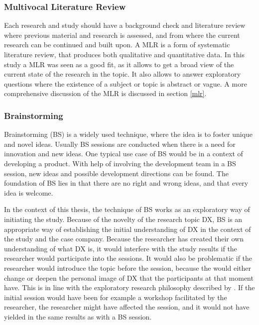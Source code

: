 \documentclass[english, 12pt, a4paper, sci, utf8, a-1b, online]{aaltothesis}
\begin{document}
\subsubsection{Multivocal Literature Review}



Each research and study should have a background check and literature review where previous material and research is assessed, and from where the current research can be continued and built upon. A MLR is a form of systematic literature review, that produces both qualitative and quantitative data. In this study a MLR was seen as a good fit, as it allows to get a broad view of the current state of the research in the topic. It also allows to answer exploratory questions where the existence of a subject or topic is abstract or vague. A more comprehensive discussion of the MLR is discussed in section \ref{mlr}.


\subsubsection{Brainstorming}

Brainstorming (BS) is a widely used technique, where the idea is to foster unique and novel ideas. Usually BS sessions are conducted when there is a need for innovation and new ideas. One typical use case of BS would be in a context of developing a product. With help of involving the development team in a BS session, new ideas and possible development directions can be found. The foundation of BS lies in that there are no right and wrong ideas, and that every idea is welcome.

In the context of this thesis, the technique of BS works as an exploratory way of initiating the study. Because of the novelty of the research topic DX, BS is an appropriate way of establishing the initial understanding of DX in the context of the study and the case company. Because the researcher has created their own understanding of what DX is, it would interfere with the study results if the researcher would participate into the sessions. It would also be problematic if the researcher would introduce the topic before the session, because the would either change or deepen the personal image of DX that the participants at that moment have. This is in line with the exploratory research philosophy described by \cite{ethnographically-informed}. If the initial session would have been for example a workshop facilitated by the researcher, the researcher might have affected the session, and it would not have yielded in the same results as with a BS session.
\end{document}
